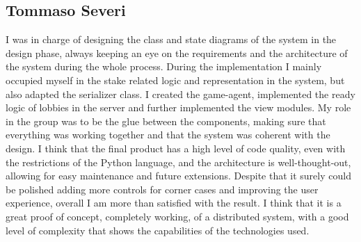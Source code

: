 \documentclass{scrartcl}
\begin{document}
\subsection{Tommaso Severi}\label{tommaso-severi}
I was in charge of designing the class and state diagrams of the system in the design phase, always
keeping an eye on the requirements and the architecture of the system during the whole process.
During the implementation I mainly occupied myself in the stake related logic and representation in the 
system, but also adapted the serializer class. I created the game-agent,
implemented the ready logic of lobbies in the server and further implemented the view modules.
My role in the group was to be the glue between the components, making sure that everything
was working together and that the system was coherent with the design.
I think that the final product has a high level of code quality, even with the restrictions of the
Python language, and the architecture is well-thought-out, allowing for easy maintenance and
future extensions. Despite that it surely could be polished adding more controls for corner 
cases and improving the user experience, overall I am more than satisfied with the result. I think 
that it is a great proof of concept, completely working, of a distributed system, with a good level of
complexity that shows the capabilities of the technologies used.



\end{document}
